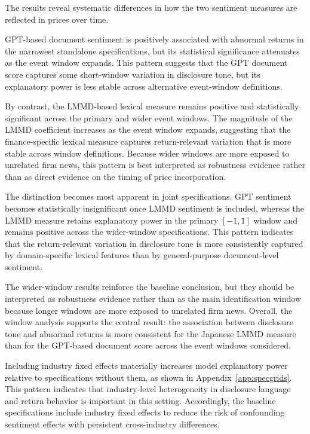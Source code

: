 

The results reveal systematic differences in how the two sentiment measures are
reflected in prices over time.

GPT-based document sentiment is positively associated with abnormal returns in the narrowest standalone specifications, but its statistical significance attenuates as the event window expands. This pattern suggests that the GPT document score captures some short-window variation in disclosure tone, but its explanatory power is less stable across alternative event-window definitions.

By contrast, the LMMD-based lexical measure remains positive and statistically significant across the primary and wider event windows. The magnitude of the LMMD coefficient increases as the event window expands, suggesting that the finance-specific lexical measure captures return-relevant variation that is more stable across window definitions. Because wider windows are more exposed to unrelated firm news, this pattern is best interpreted as robustness evidence rather than as direct evidence on the timing of price incorporation.

The distinction becomes most apparent in joint specifications. GPT sentiment becomes statistically insignificant once LMMD sentiment is included, whereas the LMMD measure retains explanatory power in the primary $[-1,1]$ window and remains positive across the wider-window specifications. This pattern indicates that the return-relevant variation in disclosure tone is more consistently captured by domain-specific lexical features than by general-purpose document-level sentiment.

The wider-window results reinforce the baseline conclusion, but they should be interpreted as robustness evidence rather than as the main identification window because longer windows are more exposed to unrelated firm news. Overall, the window analysis supports the central result: the association between disclosure tone and abnormal returns is more consistent for the Japanese LMMD measure than for the GPT-based document score across the event windows considered.

Including industry fixed effects materially increases model explanatory power relative to specifications without them, as shown in Appendix~\ref{app:specgrids}. This pattern indicates that industry-level heterogeneity in disclosure language and return behavior is important in this setting. Accordingly, the baseline specifications include industry fixed effects to reduce the risk of confounding sentiment effects with persistent cross-industry differences.

